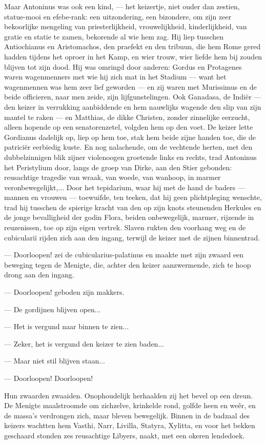 \documentclass[a4paper, 12pt, oneside, dutch]{article}
\begin{document}
Maar Antoninus was ook een kind, --- het keizertje, niet ouder dan zestien, statue-mooi en efebe-rank: een uitzondering, een bizondere, om zijn zeer bekoorlijke mengeling van priesterlijkheid, vrouwelijkheid, kinderlijkheid, van gratie en statie te zamen, bekorende al wie hem zag. Hij liep tusschen Antiochianus en Aristomachos, den praefekt en den tribuun, die hem Rome gered hadden tijdens het oproer in het Kamp, en wier trouw, wier liefde hem bij zouden blijven tot zijn dood. Hij was omringd door anderen: Gordus en Protagenes waren wagenmenners met wie hij zich mat in het Stadium --- want het wagenmennen was hem zeer lief geworden --- en zij waren met Murissimus en de beide officieren, naar men zeide, zijn lijfgunstelingen. Ook Ganadasa, de Indiër --- den keizer in verrukking aanbiddende en hem nauwlijks wagende den slip van zijn mantel te raken --- en Matthias, de dikke Christen, zonder zinnelijke eerzucht, alleen hopende op een senatorenzetel, volgden hem op den voet. De keizer lette Gordianus dadelijk op, liep op hem toe, stak hem beide zijne handen toe, die de patriciër eerbiedig kuste. En nog nalachende, om de vechtende herten, met den dubbelzinnigen blik zijner violenoogen groetende links en rechts, trad Antoninus het Peristylium door, langs de groep van Dirke, aan den Stier gebonden: reusachtige tragedie van wraak, van woede, van wanhoop, in marmer veronbewegelijkt,... Door het tepidarium, waar hij met de hand de baders --- mannen en vrouwen --- toewuifde, ten teeken, dat hij geen plichtpleging wenschte, trad hij tusschen de spierige kracht van den op zijn knots steunenden Herkules en de jonge bevalligheid der godin Flora, beiden onbewegelijk, marmer, rijzende in reuzenissen, toe op zijn eigen vertrek. Slaven rukten den voorhang weg en de cubiculariï rijden zich aan den ingang, terwijl de keizer met de zijnen binnentrad.

--- Doorloopen! zei de cubicularius-palatinus en maakte met zijn zwaard een beweging tegen de Menigte, die, achter den keizer aanzwermende, zich te hoop drong aan den ingang.

--- Doorloopen! geboden zijn makkers.

--- De gordijnen blijven open...

--- Het is vergund naar binnen te zien...

--- Zeker, het is vergund den keizer te zien baden...

--- Maar niet stil blijven staan...

--- Doorloopen! Doorloopen!

Hun zwaarden zwaaiden. Onophoudelijk herhaalden zij het bevel op een dreun. De Menigte maalstroomde om zichzelve, krinkelde rond, golfde heen en weêr, en de massa's verdrongen zich, maar bleven bewegelijk. Binnen in de badzaal des keizers wachtten hem Vasthi, Narr, Livilla, Statyra, Xylitta, en voor het bekken geschaard stonden zes reusachtige Libyers, naakt, met een okeren lendedoek.
\end{document}
